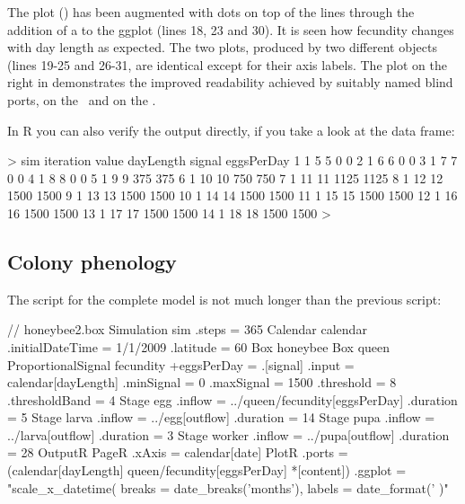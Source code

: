 The plot () has been augmented with dots on top of the lines through the addition of a  to the ggplot (lines 18, 23 and 30). It is seen how fecundity changes with day length as expected. The two plots, produced by two different  objects (lines 19-25 and 26-31, are identical except for their axis labels. The plot on the right in  demonstrates the improved readability achieved by suitably named blind ports,  on the \xaxis\ and  on the \yaxis.

In R you can also verify the output directly, if you take a look at the  data frame:

\begin{rdialog}
> sim
   iteration value dayLength signal eggsPerDay
1          1     5         5      0          0
2          1     6         6      0          0
3          1     7         7      0          0
4          1     8         8      0          0
5          1     9         9    375        375
6          1    10        10    750        750
7          1    11        11   1125       1125
8          1    12        12   1500       1500
9          1    13        13   1500       1500
10         1    14        14   1500       1500
11         1    15        15   1500       1500
12         1    16        16   1500       1500
13         1    17        17   1500       1500
14         1    18        18   1500       1500
> 
\end{rdialog}

\subsection{Colony phenology}

The script for the complete model is not much longer than the previous script:

\lstset{numbers=left}
\begin{boxscript}
// honeybee2.box
Simulation sim {
  .steps = 365
  Calendar calendar {
    .initialDateTime = 1/1/2009
    .latitude = 60
  }
  Box honeybee {
    Box queen {
      ProportionalSignal fecundity {
        +eggsPerDay = .[signal]
        .input = calendar[dayLength]
        .minSignal = 0
        .maxSignal = 1500
        .threshold = 8
        .thresholdBand = 4
      }
    }
    Stage egg {
      .inflow = ../queen/fecundity[eggsPerDay]
      .duration = 5
    }
    Stage larva {
      .inflow = ../egg[outflow]
      .duration = 14
    }
    Stage pupa {
      .inflow = ../larva[outflow]
      .duration = 3
    }
    Stage worker {
      .inflow = ../pupa[outflow]
      .duration = 28
    }
  }
  OutputR {
    PageR {
      .xAxis = calendar[date]
      PlotR {
        .ports = (calendar[dayLength] 
                  queen/fecundity[eggsPerDay] 
                  *[content])
        .ggplot = "scale_x_datetime( 
                     breaks = date_breaks('months'), 
                     labels = date_format('%
                   )"
      }
    }
  }
}
\end{boxscript}
\lstset{numbers=none}

